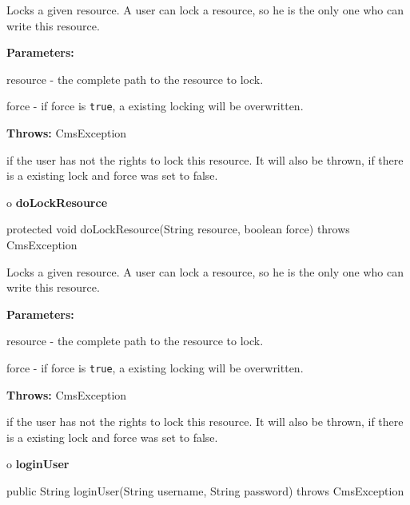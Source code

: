 \begin{description}
\htmlDD Locks a given resource. \htmlBR
A user can lock a resource, so he is the only one who can write this resource.


\begin{description}
\item {\bf Parameters:}

resource - the complete path to the resource to lock.

force - if force is {\tt true}, a existing locking will be overwritten.
\item {\bf Throws:} CmsException

if the user has not the rights to lock this resource. It will also be thrown,
if there is a existing lock and force was set to false.
\end{description}

\end{description}

o {\bf doLockResource}

\begin{PRE}
 protected void doLockResource(String resource,
                               boolean force) throws CmsException
\end{PRE}

\begin{description}
\htmlDD Locks a given resource. \htmlBR
A user can lock a resource, so he is the only one who can write this resource.


\begin{description}
\item {\bf Parameters:}

resource - the complete path to the resource to lock.

force - if force is {\tt true}, a existing locking will be overwritten.
\item {\bf Throws:} CmsException

if the user has not the rights to lock this resource. It will also be thrown,
if there is a existing lock and force was set to false.
\end{description}

\end{description}

o {\bf loginUser}

\begin{PRE}
 public String loginUser(String username,
                         String password) throws CmsException
\end{PRE}

